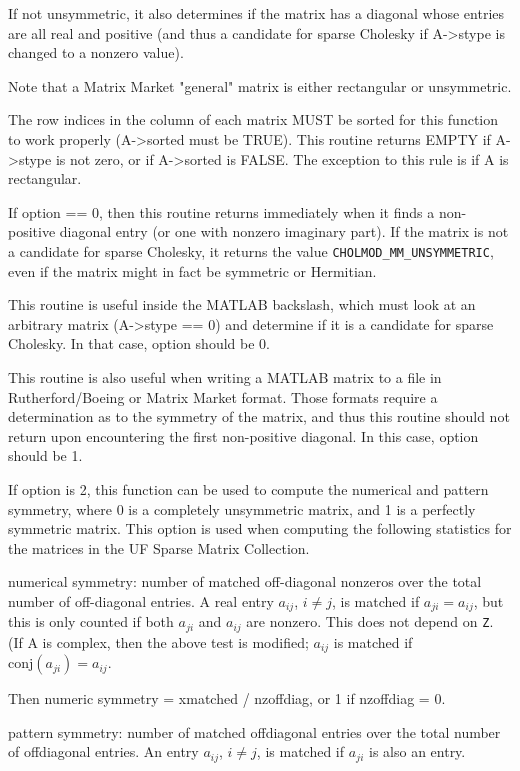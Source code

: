 \documentclass[11pt]{article}
\begin{document}
If not unsymmetric, it also determines if the matrix has a diagonal whose
entries are all real and positive (and thus a candidate for sparse Cholesky
if A->stype is changed to a nonzero value).

Note that a Matrix Market "general" matrix is either rectangular or
unsymmetric.

The row indices in the column of each matrix MUST be sorted for this function
to work properly (A->sorted must be TRUE).  This routine returns EMPTY if
A->stype is not zero, or if A->sorted is FALSE.  The exception to this rule
is if A is rectangular.

If option == 0, then this routine returns immediately when it finds a
non-positive diagonal entry (or one with nonzero imaginary part).   If the
matrix is not a candidate for sparse Cholesky, it returns the value
{\tt CHOLMOD\_MM\_UNSYMMETRIC}, even if the matrix might in fact be symmetric or
Hermitian.

This routine is useful inside the MATLAB backslash, which must look at an
arbitrary matrix (A->stype == 0) and determine if it is a candidate for
sparse Cholesky.  In that case, option should be 0.

This routine is also useful when writing a MATLAB matrix to a file in
Rutherford/Boeing or Matrix Market format.  Those formats require a
determination as to the symmetry of the matrix, and thus this routine should
not return upon encountering the first non-positive diagonal.  In this case,
option should be 1.

If option is 2, this function can be used to compute the numerical and
pattern symmetry, where 0 is a completely unsymmetric matrix, and 1 is a
perfectly symmetric matrix.  This option is used when computing the following
statistics for the matrices in the UF Sparse Matrix Collection.

	numerical symmetry: number of matched off-diagonal nonzeros over
	the total number of off-diagonal entries.  A real entry $a_{ij}$,  $i \ne j$,
	is matched if $a_{ji} = a_{ij}$, but this is only counted if both
	$a_{ji}$ and $a_{ij}$ are nonzero.  This does not depend on {\tt Z}.
	(If A is complex, then the above test is modified; $a_{ij}$ is matched
	if $\mbox{conj}(a_{ji}) = a_{ij}$.

	Then numeric symmetry = xmatched / nzoffdiag, or 1 if nzoffdiag = 0.
 
	pattern symmetry: number of matched offdiagonal entries over the
	total number of offdiagonal entries.  An entry $a_{ij}$, $i \ne j$, is
	matched if $a_{ji}$ is also an entry.
\end{document}
